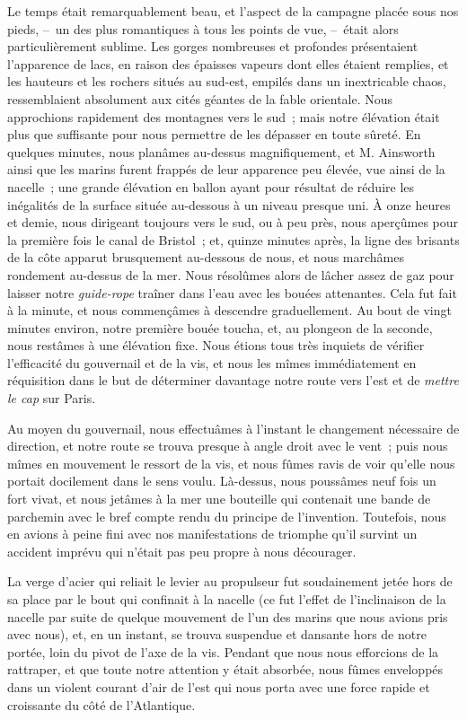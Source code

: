 \documentclass[french,twoside]{book} %
\begin{document}
Le temps était remarquablement beau, et l’aspect de la campagne placée sous nos pieds, – un des plus romantiques à tous les points de vue, – était alors particulièrement sublime. Les gorges nombreuses et profondes présentaient l’apparence de lacs, en raison des épaisses vapeurs dont elles étaient remplies, et les hauteurs et les rochers situés au sud-est, empilés dans un inextricable chaos, ressemblaient absolument aux cités géantes de la fable orientale. Nous approchions rapidement des montagnes vers le sud ; mais notre élévation était plus que suffisante pour nous permettre de les dépasser en toute sûreté. En quelques minutes, nous planâmes au-dessus magnifiquement, et M. Ainsworth ainsi que les marins furent frappés de leur apparence peu élevée, vue ainsi de la nacelle ; une grande élévation en ballon ayant pour résultat de réduire les inégalités de la surface située au-dessous à un niveau presque uni. À onze heures et demie, nous dirigeant toujours vers le sud, ou à peu près, nous aperçûmes pour la première fois le canal de Bristol ; et, quinze minutes après, la ligne des brisants de la côte apparut brusquement au-dessous de nous, et nous marchâmes rondement au-dessus de la mer. Nous résolûmes alors de lâcher assez de gaz pour laisser notre \emph{guide-rope} traîner dans l’eau avec les bouées attenantes. Cela fut fait à la minute, et nous commençâmes à descendre graduellement. Au bout de vingt minutes environ, notre première bouée toucha, et, au plongeon de la seconde, nous restâmes à une élévation fixe. Nous étions tous très inquiets de vérifier l’efficacité du gouvernail et de la vis, et nous les mîmes immédiatement en réquisition dans le but de déterminer davantage notre route vers l’est et de \emph{mettre le cap} sur Paris.\par
Au moyen du gouvernail, nous effectuâmes à l’instant le changement nécessaire de direction, et notre route se trouva presque à angle droit avec le vent ; puis nous mîmes en mouvement le ressort de la vis, et nous fûmes ravis de voir qu’elle nous portait docilement dans le sens voulu. Là-dessus, nous poussâmes neuf fois un fort vivat, et nous jetâmes à la mer une bouteille qui contenait une bande de parchemin avec le bref compte rendu du principe de l’invention. Toutefois, nous en avions à peine fini avec nos manifestations de triomphe qu’il survint un accident imprévu qui n’était pas peu propre à nous décourager.\par
La verge d’acier qui reliait le levier au propulseur fut soudainement jetée hors de sa place par le bout qui confinait à la nacelle (ce fut l’effet de l’inclinaison de la nacelle par suite de quelque mouvement de l’un des marins que nous avions pris avec nous), et, en un instant, se trouva suspendue et dansante hors de notre portée, loin du pivot de l’axe de la vis. Pendant que nous nous efforcions de la rattraper, et que toute notre attention y était absorbée, nous fûmes enveloppés dans un violent courant d’air de l’est qui nous porta avec une force rapide et croissante du côté de l’Atlantique.\par
\end{document}
